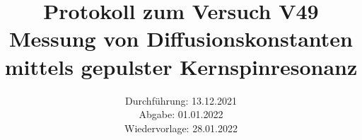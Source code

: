 \titlehead{\texttt{[image: resources/logo.jpg]}}
\title{Protokoll zum Versuch V49 \\ Messung von Diffusionskonstanten mittels gepulster Kernspinresonanz }
\date{Durchführung: 13.12.2021 \\ Abgabe: 01.01.2022 \\ Wiedervorlage: 28.01.2022 }


